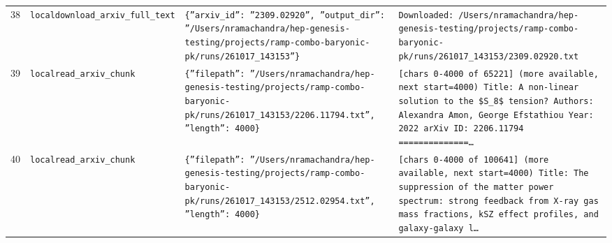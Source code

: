 \documentclass[11pt,a4paper]{article}
\begin{document}
\begin{longtable}{@{}p{}p{}p{}p{}@{}}
38 & \texttt{local}\newline\texttt{download\_\allowbreak{}arxiv\_\allowbreak{}full\_\allowbreak{}text} & \texttt{\{''arxiv\_\allowbreak{}id'':\allowbreak{} ''2309.02920'',\allowbreak{} ''output\_\allowbreak{}dir'':\allowbreak{} ''/\allowbreak{}Users/\allowbreak{}nramachandra/\allowbreak{}hep-genesis-testing/\allowbreak{}projects/\allowbreak{}ramp-combo-baryonic-pk/\allowbreak{}runs/\allowbreak{}261017\_\allowbreak{}143153''\}\allowbreak{}} & \texttt{Downloaded:\allowbreak{} /\allowbreak{}Users/\allowbreak{}nramachandra/\allowbreak{}hep-genesis-testing/\allowbreak{}projects/\allowbreak{}ramp-combo-baryonic-pk/\allowbreak{}runs/\allowbreak{}261017\_\allowbreak{}143153/\allowbreak{}2309.02920.txt} \\
39 & \texttt{local}\newline\texttt{read\_\allowbreak{}arxiv\_\allowbreak{}chunk} & \texttt{\{''filepath'':\allowbreak{} ''/\allowbreak{}Users/\allowbreak{}nramachandra/\allowbreak{}hep-genesis-testing/\allowbreak{}projects/\allowbreak{}ramp-combo-baryonic-pk/\allowbreak{}runs/\allowbreak{}261017\_\allowbreak{}143153/\allowbreak{}2206.11794.txt'',\allowbreak{} ''length'':\allowbreak{} 4000\}\allowbreak{}} & \texttt{[chars 0-4000 of 65221]\allowbreak{} (more available,\allowbreak{} next start=\allowbreak{}4000)\allowbreak{}  Title:\allowbreak{} A non-linear solution to the \$S\_\allowbreak{}8\$ tension? Authors:\allowbreak{} Alexandra Amon,\allowbreak{} George Efstathiou Year:\allowbreak{} 2022 arXiv ID:\allowbreak{} 2206.11794  =\allowbreak{}=\allowbreak{}=\allowbreak{}=\allowbreak{}=\allowbreak{}=\allowbreak{}=\allowbreak{}=\allowbreak{}=\allowbreak{}=\allowbreak{}=\allowbreak{}=\allowbreak{}=\allowbreak{}=\allowbreak{}\ldots{}\allowbreak{}} \\
40 & \texttt{local}\newline\texttt{read\_\allowbreak{}arxiv\_\allowbreak{}chunk} & \texttt{\{''filepath'':\allowbreak{} ''/\allowbreak{}Users/\allowbreak{}nramachandra/\allowbreak{}hep-genesis-testing/\allowbreak{}projects/\allowbreak{}ramp-combo-baryonic-pk/\allowbreak{}runs/\allowbreak{}261017\_\allowbreak{}143153/\allowbreak{}2512.02954.txt'',\allowbreak{} ''length'':\allowbreak{} 4000\}\allowbreak{}} & \texttt{[chars 0-4000 of 100641]\allowbreak{} (more available,\allowbreak{} next start=\allowbreak{}4000)\allowbreak{}  Title:\allowbreak{} The suppression of the matter power spectrum:\allowbreak{} strong feedback from X-ray gas mass fractions,\allowbreak{} kSZ effect profiles,\allowbreak{} and galaxy-galaxy l\ldots{}\allowbreak{}} \\

\end{longtable}
\end{document}
